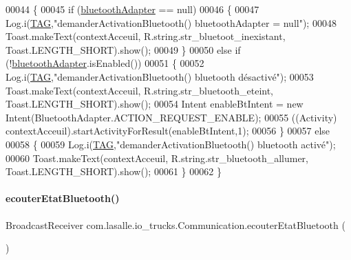 \begin{DoxyCode}
00044     \{
00045         \textcolor{keywordflow}{if} (\hyperlink{classcom_1_1lasalle_1_1io__trucks_1_1_communication_aab37c21038f7b794ab77e6705b8b5938}{bluetoothAdapter} == null)
00046         \{
00047             Log.i(\hyperlink{classcom_1_1lasalle_1_1io__trucks_1_1_communication_aec1062036f071d51a4925a3080d71004}{TAG},\textcolor{stringliteral}{"demanderActivationBluetooth() bluetoothAdapter = null"});
00048             Toast.makeText(contextAcceuil, R.string.str\_bluetoot\_inexistant, Toast.LENGTH\_SHORT).show();
00049         \}
00050         \textcolor{keywordflow}{else} \textcolor{keywordflow}{if} (!\hyperlink{classcom_1_1lasalle_1_1io__trucks_1_1_communication_aab37c21038f7b794ab77e6705b8b5938}{bluetoothAdapter}.isEnabled())
00051         \{
00052             Log.i(\hyperlink{classcom_1_1lasalle_1_1io__trucks_1_1_communication_aec1062036f071d51a4925a3080d71004}{TAG},\textcolor{stringliteral}{"demanderActivationBluetooth() bluetooth désactivé"});
00053             Toast.makeText(contextAcceuil, R.string.str\_bluetooth\_eteint, Toast.LENGTH\_SHORT).show();
00054             Intent enableBtIntent = \textcolor{keyword}{new} Intent(BluetoothAdapter.ACTION\_REQUEST\_ENABLE);
00055             ((Activity) contextAcceuil).startActivityForResult(enableBtIntent,1);
00056         \}
00057         \textcolor{keywordflow}{else}
00058         \{
00059             Log.i(\hyperlink{classcom_1_1lasalle_1_1io__trucks_1_1_communication_aec1062036f071d51a4925a3080d71004}{TAG},\textcolor{stringliteral}{"demanderActivationBluetooth() bluetooth activé"});
00060             Toast.makeText(contextAcceuil, R.string.str\_bluetooth\_allumer, Toast.LENGTH\_SHORT).show();
00061         \}
00062     \}
\end{DoxyCode}
\mbox{\label{classcom_1_1lasalle_1_1io__trucks_1_1_communication_aee896ab782ae245bdb1177d3d80ba193}} 
\paragraph{\texorpdfstring{ecouter\+Etat\+Bluetooth()}{ecouterEtatBluetooth()}}
{\footnotesize\ttfamily Broadcast\+Receiver com.\+lasalle.\+io\+\_\+trucks.\+Communication.\+ecouter\+Etat\+Bluetooth (\begin{DoxyParamCaption}{ }\end{DoxyParamCaption})}



